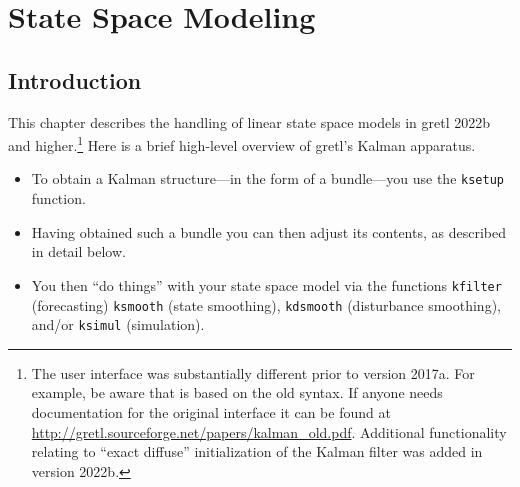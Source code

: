 \newcommand{\obsvec}{y}
\newcommand{\obsymat}{Z}
\newcommand{\obsx}{x}
\newcommand{\obsxmat}{B}
\newcommand{\obsdist}{\varepsilon}
\newcommand{\obsvar}{\Sigma}
\newcommand{\obsdim}{n}

\newcommand{\statevec}{\alpha}
\newcommand{\statecvar}{P}
\newcommand{\statemat}{T}
\newcommand{\stdist}{\eta}
\newcommand{\statevar}{\Omega}
\newcommand{\gain}{K}
\newcommand{\statemu}{\mu}
\newcommand{\stdim}{r}

\newcommand{\altstatevar}{H}
\newcommand{\altobsvar}{G}
\newcommand{\alldist}{\nu}
\newcommand{\alldim}{p}

\newcommand{\prederr}{v}
\newcommand{\predvar}{F}

\newcommand{\myvec}{\mbox{vec}}
\newcommand{\myvech}{\mbox{vech}}

\chapter{State Space Modeling}
\label{chap:kalman}

\section{Introduction}
\label{sec:amble}

This chapter describes the handling of linear state space models in
gretl 2022b and higher.\footnote{The user interface was substantially
  different prior to version 2017a.  For example, be aware that
  \cite{lucchetti11} is based on the old syntax. If anyone needs
  documentation for the original interface it can be found at
  \url{http://gretl.sourceforge.net/papers/kalman_old.pdf}. Additional
  functionality relating to ``exact diffuse'' initialization of the
  Kalman filter was added in version 2022b.} Here is a brief
high-level overview of gretl's Kalman apparatus.
%
\begin{itemize}
\item To obtain a Kalman structure---in the form of a bundle---you use
  the \texttt{ksetup} function.
\item Having obtained such a bundle you can then adjust its contents,
  as described in detail below.
\item You then ``do things'' with your state space model via the
  functions \texttt{kfilter} (forecasting) \texttt{ksmooth} (state
  smoothing), \texttt{kdsmooth} (disturbance smoothing), and/or
  \texttt{ksimul} (simulation).
\end{itemize}

